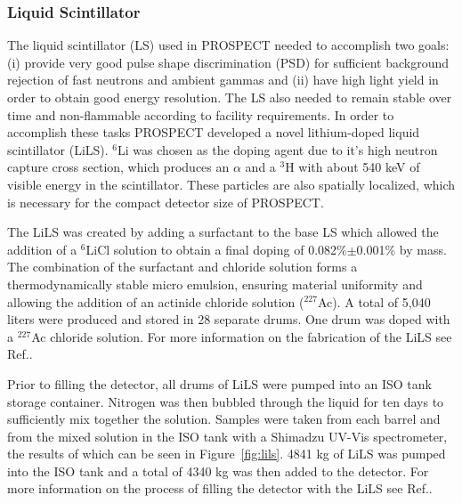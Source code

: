 \subsubsection{Liquid Scintillator}

The liquid scintillator (LS) used in PROSPECT needed to accomplish two goals: (i) provide very good pulse shape discrimination (PSD) for sufficient background rejection of fast neutrons and ambient gammas and (ii) have high light yield in order to obtain good energy resolution. 
The LS also needed to remain stable over time and non-flammable according to facility requirements. 
In order to accomplish these tasks PROSPECT developed a novel lithium-doped liquid scintillator (LiLS). 
$^6$Li was chosen as the doping agent due to it's high neutron capture cross section, which produces an $\alpha$ and a $^3$H with about 540 keV of visible energy in the scintillator. 
These particles are also spatially localized, which is necessary for the compact detector size of PROSPECT.

The LiLS was created by adding a surfactant to the base LS which allowed the addition of a $^6$LiCl solution to obtain a final doping of 0.082\%$\pm$0.001\% by mass. 
The combination of the surfactant and chloride solution forms a thermodynamically stable micro emulsion, ensuring material uniformity and allowing the addition of an actinide chloride solution ($^{227}$Ac). 
A total of 5,040 liters were produced and stored in 28 separate drums. 
One drum was doped with a $^{227}$Ac chloride solution. 
For more information on the fabrication of the LiLS see Ref.\cite{Ashenfelter:2019iqj}.

Prior to filling the detector, all drums of LiLS were pumped into an ISO tank storage container. 
Nitrogen was then bubbled through the liquid for ten days to sufficiently mix together the solution.
Samples were taken from each barrel and from the mixed solution in the ISO tank with a Shimadzu UV-Vis spectrometer, the results of which can be seen in Figure~\ref{fig:lils}.
4841 kg of LiLS was pumped into the ISO tank and a total of 4340 kg was then added to the detector. 
For more information on the process of filling the detector with the LiLS see Ref.\cite{LongNIM}.

